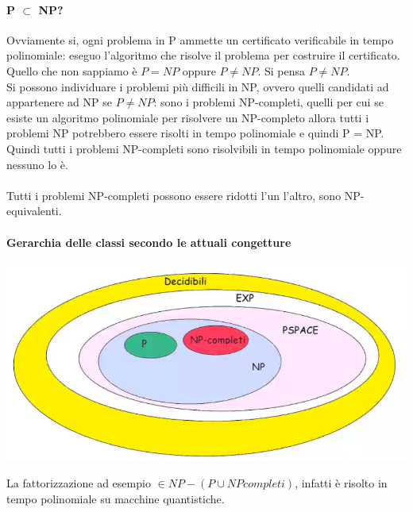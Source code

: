 \documentclass[10pt]{book}
\begin{document}
\paragraph{P $\subset$ NP?} Ovviamente si, ogni problema in P ammette un certificato verificabile in tempo polinomiale: eseguo l'algoritmo che risolve il problema per costruire il certificato.\\
Quello che non sappiamo è $P = NP$ oppure $P \neq NP$. Si pensa $P \neq NP$.\\
Si possono individuare i problemi più difficili in NP, ovvero quelli candidati ad appartenere ad NP se $P \neq NP$: sono i problemi NP-completi, quelli per cui se esiste un algoritmo polinomiale per risolvere un NP-completo allora tutti i problemi NP potrebbero essere risolti in tempo polinomiale e quindi P = NP.\\
Quindi tutti i problemi NP-completi sono risolvibili in tempo polinomiale oppure nessuno lo è.\\\\
Tutti i problemi NP-completi possono essere ridotti l'un l'altro, sono NP-equivalenti.
\paragraph{Gerarchia delle classi secondo le attuali congetture}
\begin{center}
	\includegraphics[scale=0.75]{4.png}
\end{center}
La fattorizzazione ad esempio $\in NP - (P \cup NPcompleti)$, infatti è risolto in tempo polinomiale su macchine quantistiche.
\end{document}
